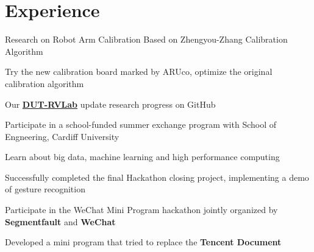 \documentclass[]{deedy-resume-openfont}
\begin{document}
\begin{minipage}[t]{0.73\textwidth}

\section{Experience}
\sectionsep
{}
\begin{tightemize}
    \item Research on Robot Arm Calibration Based on Zhengyou-Zhang Calibration Algorithm
    \item Try the new calibration board marked by ARUco, optimize the original calibration algorithm
    \item Our \href{https://github.com/DUT-RVLab}{\bf DUT-RVLab} update research progress on GitHub
    \end{tightemize}
\sectionsep

\begin{tightemize}
    \item Participate in a school-funded summer exchange program with School of Engneering, Cardiff University
    \item Learn about big data, machine learning and high performance computing
    \item Successfully completed the final Hackathon closing project, implementing a demo of gesture recognition
    \end{tightemize}
\sectionsep

\begin{tightemize}
    \item Participate in the WeChat Mini Program hackathon jointly organized by \textbf{Segmentfault} and \textbf{WeChat}
    \item Developed a mini program that tried to replace the \textbf{Tencent Document}
    \end{tightemize}
\sectionsep






\end{minipage}
\end{document}
